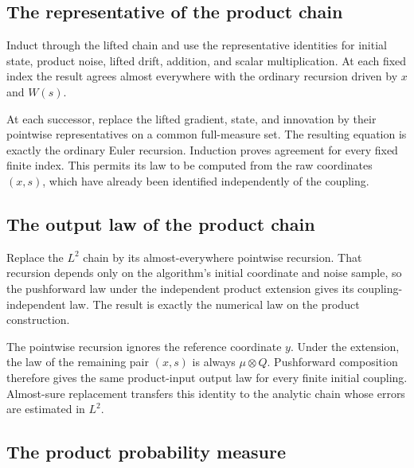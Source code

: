 \documentclass[11pt,a4paper]{report}
\begin{document}
\subsection{\texorpdfstring{The representative of the product chain}{The representative of the product chain}}
\label{report-step-UnadjustedLangevin-ProductReference-lean-7}


Induct through the lifted chain and use the representative identities for initial state, product noise, lifted drift, addition, and scalar multiplication. At each fixed index the result agrees almost everywhere with the ordinary recursion driven by \(x\) and \(W(s)\).



At each successor, replace the lifted gradient, state, and innovation by their pointwise representatives on a common full-measure set. The resulting equation is exactly the ordinary Euler recursion. Induction proves agreement for every fixed finite index. This permits its law to be computed from the raw coordinates \((x,s)\), which have already been identified independently of the coupling.

\subsection{\texorpdfstring{The output law of the product chain}{The output law of the product chain}}
\label{report-step-UnadjustedLangevin-ProductReference-lean-8}


Replace the \(L^2\) chain by its almost-everywhere pointwise recursion. That recursion depends only on the algorithm's initial coordinate and noise sample, so the pushforward law under the independent product extension gives its coupling-independent law. The result is exactly the numerical law on the product construction.



The pointwise recursion ignores the reference coordinate \(y\). Under the extension, the law of the remaining pair \((x,s)\) is always \(\mu\otimes Q\). Pushforward composition therefore gives the same product-input output law for every finite initial coupling. Almost-sure replacement transfers this identity to the analytic chain whose errors are estimated in \(L^2\).

\subsection{\texorpdfstring{The product probability measure}{The product probability measure}}
\label{report-step-UnadjustedLangevin-ProductReference-lean-9}
\end{document}
